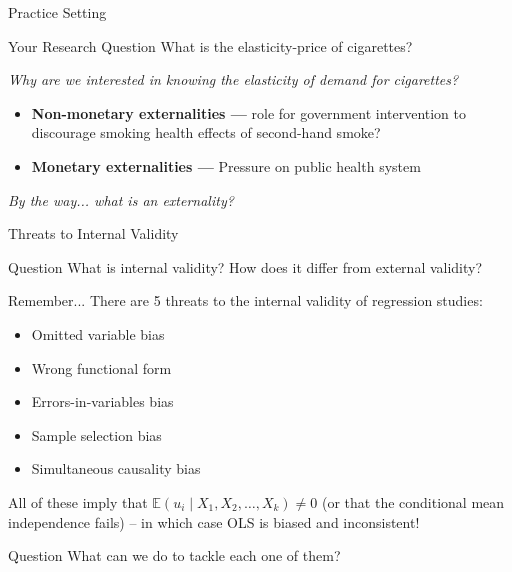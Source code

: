 \documentclass[notes,10pt, aspectratio=169]{beamer}
\begin{document}
\begin{frame}{Practice Setting}
\begin{block}{Your Research Question}
    What is the elasticity-price of cigarettes?
\end{block}\vspace{.5cm}
\textit{Why are we interested in knowing the elasticity of demand for cigarettes?}\\[1em]

\begin{itemize}
    \item \textbf{Non-monetary externalities ---} role for government intervention to discourage smoking health effects of second-hand smoke? \\[1em]
    \item \textbf{Monetary externalities ---} Pressure on public health system
\end{itemize}
\vfill
\textit{By the way... what is an externality?}

\end{frame}


\begin{frame}{Threats to Internal Validity}

\begin{exampleblock}{Question}
    What is internal validity? How does it differ from external validity?
\end{exampleblock}

Remember... There are 5 threats to the internal validity of regression studies:
\begin{itemize}
    \item Omitted variable bias
    \item Wrong functional form
    \item Errors-in-variables bias
    \item Sample selection bias
    \item Simultaneous causality bias
\end{itemize}\vspace{1em}
All of these imply that $\mathbb{E}(u_i\mid X_1, X_2, \dots, X_k)\neq 0$ (or that the conditional mean independence fails) -- in which case OLS is biased and inconsistent!


\begin{exampleblock}{Question}
    What can we do to tackle each one of them?
\end{exampleblock}

\end{frame}
\end{document}
